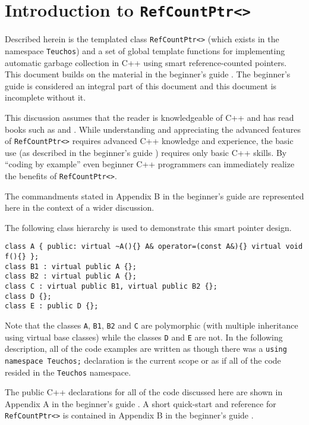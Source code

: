 
\section{Introduction to {}\texttt{Ref\-Count\-Ptr<>}}
\label{rcp:sec:intro}
%

Described herein is the templated class {}\texttt{Ref\-Count\-Ptr<>}
(which exists in the namespace {}\texttt{Teuchos}) and a set of global
template functions for implementing automatic garbage collection in
C++ using smart reference-counted pointers.  This document builds on
the material in the beginner's guide
{}\cite{ref:RefCountPtrBeginnersGuide}.  The beginner's guide is
considered an integral part of this document and this document is
incomplete without it.

This discussion assumes that the reader is knowledgeable of C++ and
has read books such as {}\cite{ref:stroustrup_2000} and
{}\cite{ref:meyers_1994}.  While understanding and appreciating the
advanced features of {}\texttt{Ref\-Count\-Ptr<>} requires advanced C++
knowledge and experience, the basic use (as described in the
beginner's guide {}\cite{ref:RefCountPtrBeginnersGuide}) requires only
basic C++ skills.  By ``coding by example'' even beginner C++
programmers can immediately realize the benefits of
{}\texttt{Ref\-Count\-Ptr<>}.

The commandments stated in Appendix B in the beginner's guide
{}\cite{ref:RefCountPtrBeginnersGuide} are represented here in the
context of a wider discussion.

The following class hierarchy is used to demonstrate this smart
pointer design.

{\scriptsize\begin{verbatim}
class A { public: virtual ~A(){} A& operator=(const A&){} virtual void f(){} };
class B1 : virtual public A {};
class B2 : virtual public A {};
class C : virtual public B1, virtual public B2 {};
class D {};
class E : public D {};
\end{verbatim}

}Note that the classes {}\texttt{A}, {}\texttt{B1}, {}\texttt{B2} and
{}\texttt{C} are polymorphic (with multiple inheritance using virtual
base classes) while the classes {}\texttt{D} and {}\texttt{E} are not.
In the following description, all of the code examples are written as
though there was a {}\texttt{using namespace Teuchos;} declaration is
the current scope or as if all of the code resided in the
{}\texttt{Teuchos} namespace.

The public C++ declarations for all of the code discussed here are
shown in Appendix A in the beginner's guide
{}\cite{ref:RefCountPtrBeginnersGuide}.  A short quick-start and
reference for {}\texttt{Ref\-Count\-Ptr<>} is contained in Appendix B in
the beginner's guide {}\cite{ref:RefCountPtrBeginnersGuide}.

